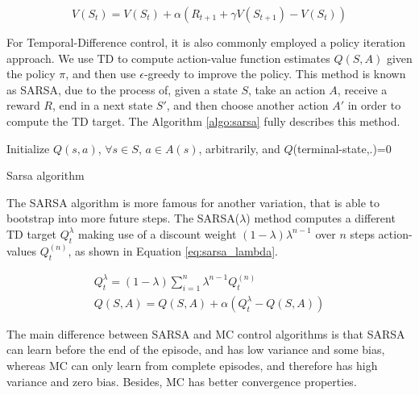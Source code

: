 \begin{equation}
V(S_t) = V(S_t) + \alpha(R_{t+1} + \gamma V(S_{t+1}) - V(S_t))
\label{eq:TD0_update}
\end{equation}

For Temporal-Difference control, it is also commonly employed a policy iteration approach. We use TD to compute action-value function estimates $Q(S,A)$ given the policy $\pi$, and then use $\epsilon$-greedy to improve the policy. This method is known as SARSA, due to the process of, given a state $S$, take an action $A$, receive a reward $R$, end in a next state $S'$, and then choose another action $A'$ in order to compute the TD target. The Algorithm \ref{algo:sarsa} fully describes this method.

\begin{algorithm}[H]
    \DontPrintSemicolon
    \SetAlgoLined
    Initialize $Q(s,a)$, $\forall s \in S$, $a \in A(s)$, arbitrarily, and $Q$(terminal-state,.)=0\;
    \caption{Sarsa algorithm}
    \label{algo:sarsa}
\end{algorithm}

The SARSA algorithm is more famous for another variation, that is able to bootstrap into more future steps. The SARSA($\lambda$) method computes a different TD target $Q_t^{\lambda}$ making use of a discount weight $(1-\lambda) \lambda^{n-1}$ over $n$ steps action-values $Q_t^{(n)}$, as shown in Equation \eqref{eq:sarsa_lambda}.

\begin{align}
Q_t^{\lambda} = (1 - \lambda) \sum_{i=1}^{n}{\lambda^{n-1}Q_t^{(n)}} \\
Q(S,A) = Q(S,A) + \alpha( Q_t^{\lambda} - Q(S,A))
\label{eq:sarsa_lambda}
\end{align}

The main difference between SARSA and MC control algorithms is that SARSA can learn before the end of the episode, and has low variance and some bias, whereas MC can only learn from complete episodes, and therefore has high variance and zero bias. Besides, MC has better convergence properties.

